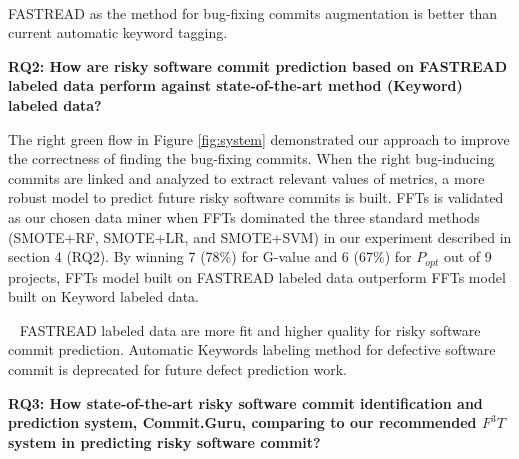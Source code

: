 \documentclass[10pt,conference]{IEEEtran}
\newenvironment{RQ}[1]%
{\noindent\begin{minipage}[c]{\linewidth}%
\begin{bclogo}[couleur=gray!25,%
                arrondi=0.1,%
                logo=\bctrombone,%
                ombre=true]{~#1}}%
{\end{bclogo}\end{minipage}\vspace{2mm}}
\begin{document}

\begin{RQ}{}
\vspace{-10pt}

FASTREAD as the method for bug-fixing commits augmentation is better than current automatic keyword tagging.
\end{RQ}
 
 
 \textbf{RQ2: { How are risky software commit prediction based on FASTREAD labeled data perform against state-of-the-art method (Keyword) labeled data?}}
  

The right green flow in Figure \ref{fig:system} demonstrated our approach to improve the correctness of finding the bug-fixing commits. When the right bug-inducing commits are linked and analyzed to extract relevant values of metrics, a more robust model to predict future risky software commits is built. FFTs is validated as our chosen data miner when FFTs dominated the three standard methods (SMOTE+RF, SMOTE+LR, and SMOTE+SVM) in our experiment described in section 4 (RQ2). By winning 7 (78\%) for G-value and 6 (67\%) for $P_{opt}$ out of 9 projects, FFTs model built on FASTREAD labeled data outperform FFTs model built on Keyword labeled data. 
 

\begin{RQ}{}
\vspace{-10pt}
FASTREAD labeled data are more fit and higher quality for risky software commit prediction. Automatic Keywords labeling method for defective software commit is deprecated for future defect prediction work.  
\end{RQ}
  

\textbf{RQ3: {How state-of-the-art risky software commit identification and prediction system, Commit.Guru, comparing to our recommended $F^3T$ system in predicting risky software commit?}}
 
\end{document}
